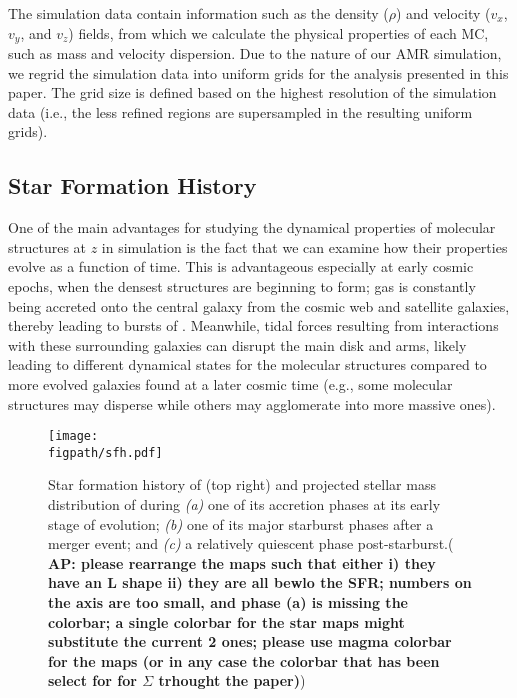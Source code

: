 \IfFileExists{emulateapjlegacy.cls}{\documentclass[iop]{emulateapjlegacy}}{\documentclass[iop]{emulateapj}}
\newcommand{\AP}[1]{({\bf \color{apcolor} AP: #1})}
\def\figpath{./Fig}
\begin{document}
The simulation data contain information such as the density ($\rho$) and velocity ($v_x$, $v_y$, and $v_z$) fields, from which we calculate the physical properties of each MC, such as mass and velocity dispersion. Due to the nature of our AMR simulation, we regrid the simulation data into uniform grids for the analysis presented in this paper. The grid size is defined based on the highest resolution of the simulation data (i.e., the less refined regions are supersampled in the resulting uniform grids).

\subsection{Star Formation History} \label{sec:sfh}
One of the main advantages for studying the dynamical properties of molecular structures at $z$ in simulation is the fact that we can examine how their properties evolve as a function of time.
%
This is advantageous especially at early cosmic epochs, when the densest structures are beginning to form; gas is constantly being accreted onto the central galaxy from the cosmic web and satellite galaxies, thereby leading to bursts of \SF. Meanwhile, tidal forces resulting from interactions with these surrounding galaxies can disrupt the main disk and arms, likely leading to different dynamical states for the molecular structures compared to more evolved galaxies found at a later cosmic time (e.g., some molecular structures may disperse while others may agglomerate into more massive ones). %

\begin{figure*}[!htbp]
\centering
\texttt{[image: \\figpath/sfh.pdf]}
\caption{
    Star formation history of \flower (top right) and projected stellar mass distribution of \flower during {\it (a)} one of its accretion phases at its early stage of evolution; {\it (b)} one of its major starburst phases after a merger event; and {\it (c)} a relatively quiescent phase post-starburst.\AP{please rearrange the maps such that either i) they have an L shape ii) they are all bewlo the SFR; numbers on the axis are too small, and phase (a) is missing the colorbar; a single colorbar for the star maps might substitute the current 2 ones; please use magma colorbar for the maps (or in any case the colorbar that has been select for for $\Sigma$ trhought the paper)}
\label{fig:SFH}}
\end{figure*}
\end{document}
